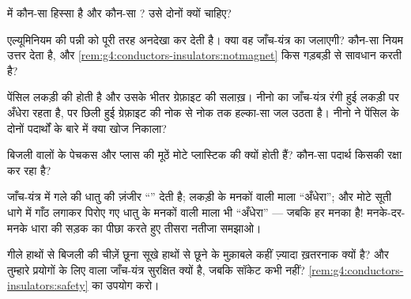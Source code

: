 \begin{exercise}[$\star$]\label{exo:g4:conductors-insulators:6}
 में कौन-सा हिस्सा  है और कौन-सा ? उसे दोनों
क्यों चाहिए?
\end{exercise}

\begin{exercise}[$\star$]\label{exo:g4:conductors-insulators:7}
एल्यूमिनियम की पन्नी  को पूरी तरह अनदेखा कर देती है। क्या वह
जाँच-यंत्र का  जलाएगी? कौन-सा नियम उत्तर देता है, और
\cref{rem:g4:conductors-insulators:notmagnet} किस गड़बड़ी से सावधान
करती है?
\end{exercise}

\begin{exercise}[$\star$]\label{exo:g4:conductors-insulators:8}
पेंसिल लकड़ी की होती है और उसके भीतर ग्रेफ़ाइट की सलाख़। नीनो का
जाँच-यंत्र रंगी हुई लकड़ी पर अँधेरा रहता है, पर छिली हुई ग्रेफ़ाइट
की नोक से नोक तक हल्का-सा जल उठता है। नीनो ने पेंसिल के दोनों
पदार्थों के बारे में क्या खोज निकाला?
\end{exercise}

\begin{exercise}[$\star$]\label{exo:g4:conductors-insulators:9}
बिजली वालों के पेचकस और प्लास की मूठें मोटे प्लास्टिक की क्यों होती
हैं? कौन-सा पदार्थ किसकी रक्षा कर रहा है?
\end{exercise}

\begin{exercise}[$\star\star$]\label{exo:g4:conductors-insulators:10}
जाँच-यंत्र में गले की धातु की ज़ंजीर ``'' देती है; लकड़ी के
मनकों वाली माला ``अँधेरा''; और मोटे सूती धागे में गाँठ लगाकर पिरोए गए
धातु के मनकों वाली माला भी ``अँधेरा'' --- जबकि हर मनका  है!
मनके-दर-मनके धारा की सड़क का पीछा करते हुए तीसरा नतीजा समझाओ।
\end{exercise}

\begin{exercise}[$\star\star$]\label{exo:g4:conductors-insulators:11}
गीले हाथों से बिजली की चीज़ें छूना सूखे हाथों से छूने के मुक़ाबले
कहीं ज़्यादा ख़तरनाक क्यों है? और तुम्हारे प्रयोगों के लिए  वाला
जाँच-यंत्र सुरक्षित क्यों है, जबकि सॉकेट कभी नहीं?
\cref{rem:g4:conductors-insulators:safety} का उपयोग करो।
\end{exercise}
